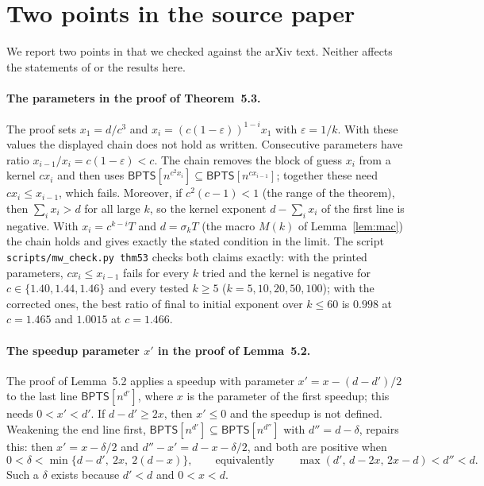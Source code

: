 \documentclass[11pt]{article}
\theoremstyle{definition}
\newcommand{\BPTS}{\mathsf{BPTS}}
\begin{document}
\section{Two points in the source paper}\label{sec:errata}

We report two points in \cite{MW21} that we checked against the arXiv text. Neither affects the statements of \cite{MW21} or the results here.

\paragraph{The parameters in the proof of Theorem~5.3.}
The proof sets $x_1=d/c^3$ and $x_i=(c(1-\varepsilon))^{1-i}x_1$ with $\varepsilon=1/k$. With these values the displayed chain does not hold as written. Consecutive parameters have ratio $x_{i-1}/x_i=c(1-\varepsilon)<c$. The chain removes the block of guess $x_i$ from a kernel $cx_i$ and then uses $\BPTS[n^{c^2x_i}]\subseteq\BPTS[n^{cx_{i-1}}]$; together these need $cx_i\le x_{i-1}$, which fails. Moreover, if $c^2(c-1)<1$ (the range of the theorem), then $\sum_ix_i>d$ for all large $k$, so the kernel exponent $d-\sum_ix_i$ of the first line is negative. With $x_i=c^{k-i}T$ and $d=\sigma_kT$ (the macro $M(k)$ of Lemma~\ref{lem:mac}) the chain holds and gives exactly the stated condition in the limit. The script \texttt{scripts/mw\_check.py thm53} checks both claims exactly: with the printed parameters, $cx_i\le x_{i-1}$ fails for every $k$ tried and the kernel is negative for $c\in\{1.40,1.44,1.46\}$ and every tested $k\ge5$ ($k=5,10,20,50,100$); with the corrected ones, the best ratio of final to initial exponent over $k\le60$ is $0.998$ at $c=1.465$ and $1.0015$ at $c=1.466$.

\paragraph{The speedup parameter $x'$ in the proof of Lemma~5.2.}
The proof of Lemma~5.2 applies a speedup with parameter $x'=x-(d-d')/2$ to the last line $\BPTS[n^{d'}]$, where $x$ is the parameter of the first speedup; this needs $0<x'<d'$. If $d-d'\ge2x$, then $x'\le0$ and the speedup is not defined. Weakening the end line first, $\BPTS[n^{d'}]\subseteq\BPTS[n^{d''}]$ with $d''=d-\delta$, repairs this: then $x'=x-\delta/2$ and $d''-x'=d-x-\delta/2$, and both are positive when
\[ 0<\delta<\min\{d-d',\ 2x,\ 2(d-x)\},\qquad\text{equivalently}\qquad \max(d',\,d-2x,\,2x-d)<d''<d. \]
Such a $\delta$ exists because $d'<d$ and $0<x<d$.
\end{document}
